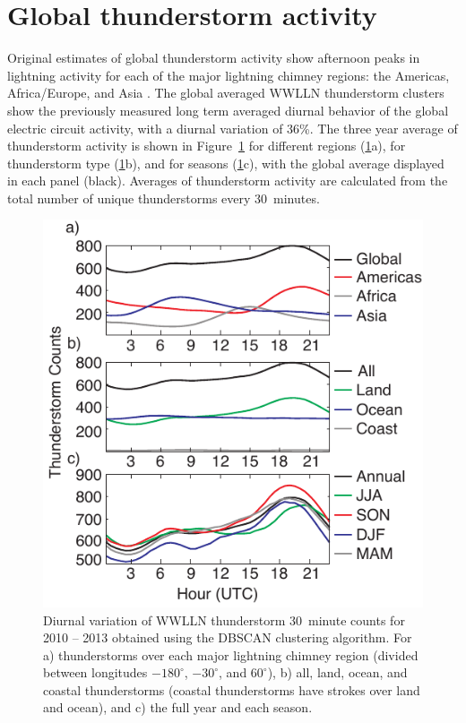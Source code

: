 \section{Global thunderstorm activity}

Original estimates of global thunderstorm activity show afternoon peaks in lightning activity for each of the major lightning chimney regions: the Americas, Africa/Europe, and Asia \citep{Wilson1921}.
The global averaged WWLLN thunderstorm clusters show the previously measured long term averaged diurnal behavior of the global electric circuit activity, with a diurnal variation of 36\%.
The three year average of thunderstorm activity is shown in Figure~\ref{gec:fig:carnegie} for different regions (\ref{gec:fig:carnegie}a), for thunderstorm type (\ref{gec:fig:carnegie}b), and for seasons (\ref{gec:fig:carnegie}c), with the global average displayed in each panel (black).
Averages of thunderstorm activity are calculated from the total number of unique thunderstorms every 30~minutes.

 \begin{figure}[ht!]
    \centering
     \includegraphics[scale=1]{GEC/Figures/carnegie.pdf} 
    \caption{Diurnal variation of WWLLN thunderstorm 30~minute counts for 2010 -- 2013 obtained using the DBSCAN clustering algorithm.
    		 For a) thunderstorms over each major lightning chimney region (divided between longitudes $-180^\circ$, $-30^\circ$, and $60^\circ$),
		 b) all, land, ocean, and coastal thunderstorms (coastal thunderstorms have strokes over land and ocean), 
		 and c) the full year and each season.
		 }
    \label{gec:fig:carnegie}
 \end{figure}

